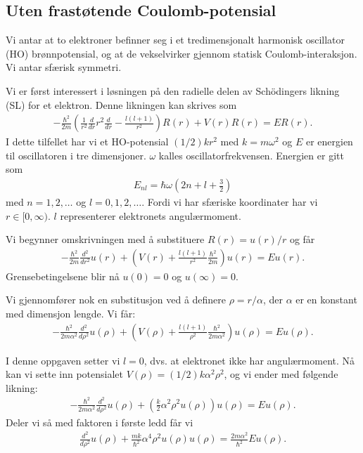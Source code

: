 \documentclass[11pt]{article}
\begin{document}
\subsection{Uten frastøtende Coulomb-potensial}
Vi antar at to elektroner befinner seg i et tredimensjonalt harmonisk
oscillator (HO) brønnpotensial, og at de vekselvirker gjennom
statisk Coulomb-interaksjon. Vi antar sfærisk symmetri. 

Vi er først interessert i løsningen på den radielle delen av
Schödingers likning (SL) for et elektron. Denne likningen kan skrives
som 
\begin{align}
  -\frac{ \hbar^2 }{ 2m }\left( \frac{ 1 }{ r^2 }\frac{ d }{ dr }r^2
  \frac{ d }{ dr } - \frac{ l(l+1) }{ r^2 }   \right) R(r) + V(r)R(r)
  = ER(r).\label{eq:SL}
\end{align}
I dette tilfellet har vi et HO-potensial $(1/2)kr^2$ med $k=m\omega^2$
og $E$ er energien til oscillatoren i tre dimensjoner. $\omega$ kalles
oscillatorfrekvensen. Energien er gitt som 
\begin{align}
  E_{nl} = \hbar\omega\left(2n+l+\frac{ 3 }{ 2 }\right)\label{eq:Energy}
\end{align}
med $n=1,2,\dots$ og $l=0,1,2,\dots$. Fordi vi har sfæriske
koordinater har vi $r\in [0,\infty)$. $l$ representerer elektronets
angulærmoment. 

Vi begynner omskrivningen med å substituere $R(r) = u(r)/r$ og får 
\begin{align*}
  -\frac{ \hbar^2 }{ 2m }\frac{ d^2 }{ dr^2 }u(r) + \left(V(r) +
  \frac{ l(l+1) }{ r^2 }\frac{ \hbar^2 }{ 2m }\right)u(r) = Eu(r).
\end{align*}
Grensebetingelsene blir nå $u(0)=0$ og $u(\infty)=0$. 

Vi gjennomfører nok en substitusjon ved å definere $\rho = r/\alpha$,
der $\alpha$ er en konstant med dimensjon lengde. Vi får:
\begin{align*}
  -\frac{ \hbar^2 }{ 2m\alpha^2 }\frac{ d^2 }{ d\rho^2 }u(\rho) +
  \left(V(\rho) + \frac{ l(l+1) }{ \rho^2 }\frac{ \hbar^2 }{
  2m\alpha^2 }\right)u(\rho) = Eu(\rho).
\end{align*}

I denne oppgaven setter vi $l=0$, dvs. at elektronet ikke har
angulærmoment. Nå kan vi sette inn potensialet $V(\rho) =
(1/2)k\alpha^2\rho^2$, og vi ender med følgende likning:
\begin{align*}
   -\frac{ \hbar^2 }{ 2m\alpha^2 }\frac{ d^2 }{ d\rho^2 }u(\rho) +
  \left( \frac{ k }{ 2 }\alpha^2\rho^2u(\rho) \right)u(\rho) = Eu(\rho).
\end{align*}
Deler vi så med faktoren i første ledd får vi
\begin{align*}
    \frac{ d^2 }{ d\rho^2 }u(\rho) + \frac{ mk }{ \hbar^2
  }\alpha^4\rho^2u(\rho) u(\rho) = \frac{ 2m\alpha^2 }{ \hbar^2 }Eu(\rho).
\end{align*}
\end{document}
